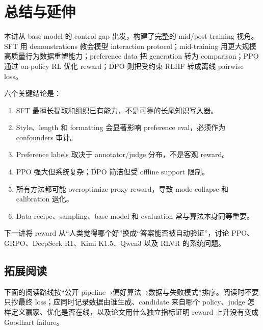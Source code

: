 \section{总结与延伸}

本讲从 base model 的 control gap 出发，构建了完整的 mid/post-training 视角。SFT 用 demonstrations 教会模型 interaction protocol；mid-training 用更大规模高质量行为数据重塑能力；preference data 把 generation 转为 comparison；PPO 通过 on-policy RL 优化 reward；DPO 则把受约束 RLHF 转成离线 pairwise loss。

六个关键结论是：

\begin{enumerate}
\item SFT 最擅长提取和组织已有能力，不是可靠的长尾知识写入器。
\item Style、length 和 formatting 会显著影响 preference eval，必须作为 confounders 审计。
\item Preference labels 取决于 annotator/judge 分布，不是客观 reward。
\item PPO 强大但系统复杂；DPO 简洁但受 offline support 限制。
\item 所有方法都可能 overoptimize proxy reward，导致 mode collapse 和 calibration 退化。
\item Data recipe、sampling、base model 和 evaluation 常与算法本身同等重要。
\end{enumerate}

下一讲将 reward 从“人类觉得哪个好”换成“答案能否被自动验证”，讨论 PPO、GRPO、DeepSeek R1、Kimi K1.5、Qwen3 以及 RLVR 的系统问题。

\subsection{拓展阅读}

下面的阅读路线按“公开 pipeline→偏好算法→数据与失败模式”排序。阅读时不要只抄最终 loss；应同时记录数据由谁生成、candidate 来自哪个 policy、judge 怎样定义赢家、优化是否在线，以及论文用什么独立指标证明 reward 上升没有变成 Goodhart failure。

